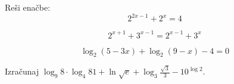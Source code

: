 \documentclass{izpit}
\begin{document}
\naloga[\tocke{12}]
  Reši enačbe:
  \podnaloga[\tocke{4}]
  \[2^{2x-1}+2^x=4\]
  \prostor[1]

  \podnaloga[\tocke{4}]
  \[2^{x+1}+3^{x-1}=2^{x-1}+3^x\]
  \prostor[1]

  \podnaloga[\tocke{4}]
  \[\log_2{\left(5-3x\right)}+\log_2{\left(9-x\right)}-4=0\]
  \prostor[1]

\naloga*[\tocke{6}]
  Izračunaj $\log_9{8}\cdot\log_4{81}+\ln{\sqrt{e}}+\log_3{\frac{\sqrt{3}}{3}}-10^{\log{2}}$.
  \prostor[1]
\end{document}
